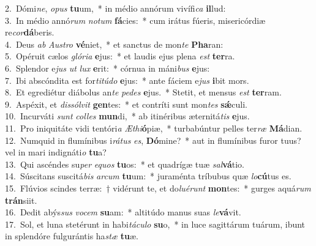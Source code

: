 {2.~}Dómi\textit{ne}, \textit{o}\textit{pus} \textbf{tu}um,~* in médio annórum vivífi\textit{ca} \textbf{il}lud:\\
{3.~}In médio annó\textit{rum} \textit{no}\textit{tum} \textbf{fá}cies:~* cum irátus fúeris, misericórdiæ re\textit{cor}\textbf{dá}beris.\\
{4.~}Deus \textit{ab} \textit{Au}\textit{stro} \textbf{vé}niet,~* et sanctus de mon\textit{te} \textbf{Pha}ran:\\
{5.~}Opéruit cælos \textit{gló}\textit{ri}\textit{a} \textbf{e}jus:~* et laudis ejus plena \textit{est} \textbf{ter}ra.\\
{6.~}Splendor e\textit{jus} \textit{ut} \textit{lux} \textbf{e}rit:~* córnua in máni\textit{bus} \textbf{e}jus:\\
{7.~}Ibi abscóndita est for\textit{ti}\textit{tú}\textit{do} \textbf{e}jus:~* ante fáciem e\textit{jus} \textbf{i}bit mors.\\
{8.~}Et egrediétur diábolus an\textit{te} \textit{pe}\textit{des} \textbf{e}jus.~* Stetit, et mensus \textit{est} \textbf{ter}ram.\\
{9.~}Aspéxit, et \textit{dis}\textit{sól}\textit{vit} \textbf{gen}tes:~* et contríti sunt mon\textit{tes} \textbf{sǽ}culi.\\
{10.~}Incurváti \textit{sunt} \textit{col}\textit{les} \textbf{mun}di,~* ab itinéribus æternitá\textit{tis} \textbf{e}jus.\\
{11.~}Pro iniquitáte vidi tentóri\textit{a} \textit{Æ}\textit{thi}\textbf{ó}piæ,~* turbabúntur pelles ter\textit{ræ} \textbf{Má}dian.\\
{12.~}Numquid in flumínibus i\textit{rá}\textit{tus} \textit{es}, \textbf{Dó}mine?~* aut in flumínibus furor tuus? vel in mari indignáti\textit{o} \textbf{tu}a?\\
{13.~}Qui ascéndes su\textit{per} \textit{e}\textit{quos} \textbf{tu}os:~* et quadrígæ tuæ \textit{sal}\textbf{vá}tio.\\
{14.~}Súscitans suscitá\textit{bis} \textit{ar}\textit{cum} \textbf{tu}um:~* juraménta tríbubus quæ \textit{lo}\textbf{cú}tus es.\\
{15.~}Flúvios scindes terræ:~† vidérunt te, et do\textit{lu}\textit{é}\textit{runt} \textbf{mon}tes:~* gurges aquá\textit{rum} \textbf{trán}siit.\\
{16.~}Dedit abýs\textit{sus} \textit{vo}\textit{cem} \textbf{su}am:~* altitúdo manus suas \textit{le}\textbf{vá}vit.\\
{17.~}Sol, et luna stetérunt in habi\textit{tá}\textit{cu}\textit{lo} \textbf{su}o,~* in luce sagittárum tuárum, ibunt in splendóre fulgurántis ha\textit{stæ} \textbf{tu}æ.\\
